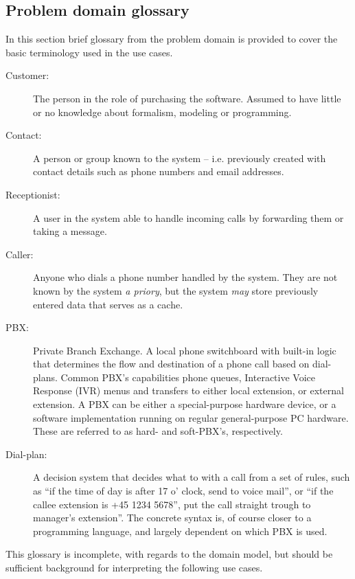 \subsection{Problem domain glossary}
In this section brief glossary from the problem domain is provided to cover the basic terminology used in the use cases.
\begin{description}
  \item[Customer:] The person in the role of purchasing the software. Assumed to have little or no knowledge about formalism, modeling or programming.
  \item[Contact:] A person or group known to the system -- i.e. previously created with contact details such as phone numbers and email addresses.
  \item[Receptionist:] A user in the system able to handle incoming calls by forwarding them or taking a message.
  \item[Caller:] Anyone who dials a phone number handled by the system. They are not known by the system \textit{a priory}, but the system \textit{may} store previously entered data that serves as a cache.
  \item[PBX:] Private Branch Exchange. A local phone switchboard with built-in logic that determines the flow and destination of a phone call based on dial-plans. Common PBX's capabilities phone queues, Interactive Voice Response (IVR) menus and transfers to either local extension, or external extension. A PBX can be either a special-purpose hardware device, or a software implementation running on regular general-purpose PC hardware. These are referred to as hard- and soft-PBX's, respectively.
  \item[Dial-plan:] A decision system that decides what to with a call from a set of rules, such as ``if the time of day is after 17 o' clock, send to voice mail'', or ``if the callee extension is +45 1234 5678'', put the call straight trough to manager's extension''. The concrete syntax is, of course closer to a programming language, and largely dependent on which PBX is used.

\end{description}
This glossary is incomplete, with regards to the domain model, but should be sufficient background for interpreting the following use cases.\\\\

